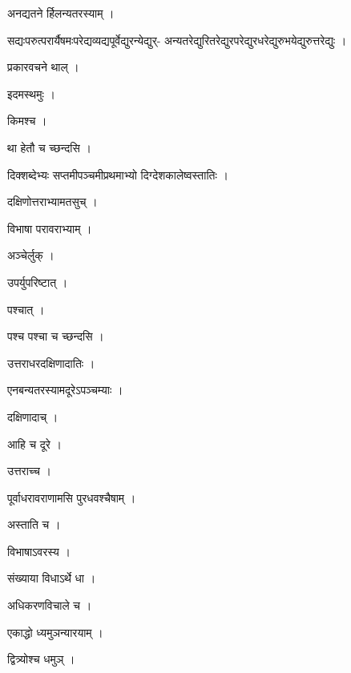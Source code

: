 \documentclass[10pt, openany]{book}
\begin{document}
\noindent अनद्यतने र्हिलन्यतरस्याम् ।

\noindent सद्यःपरुत्परार्यैषमःपरेद्यव्यद्यपूर्वेद्युरन्येद्युर्- अन्यतरेद्युरितरेद्युरपरेद्युरधरेद्युरुभयेद्युरुत्तरेद्युः ।

\noindent प्रकारवचने थाल् ।

\noindent इदमस्थमुः ।

\noindent किमश्च ।

\noindent था हेतौ च च्छन्दसि ।

\noindent दिक्शब्देभ्यः सप्तमीपञ्चमीप्रथमाभ्यो दिग्देशकालेष्वस्तातिः ।

\noindent दक्षिणोत्तराभ्यामतसुच् ।

\noindent विभाषा परावराभ्याम् ।

\noindent अञ्चेर्लुक् ।

\noindent उपर्युपरिष्टात् ।

\noindent पश्चात् ।

\noindent पश्च पश्चा च च्छन्दसि ।

\noindent उत्तराधरदक्षिणादातिः ।

\noindent एनबन्यतरस्यामदूरेऽपञ्चम्याः ।

\noindent दक्षिणादाच् ।

\noindent आहि च दूरे ।

\noindent उत्तराच्च ।

\noindent पूर्वाधरावराणामसि पुरधवश्चैषाम् ।

\noindent अस्ताति च ।

\noindent विभाषाऽवरस्य ।

\noindent संख्याया विधाऽर्थे धा ।

\noindent अधिकरणविचाले च ।

\noindent एकाद्धो ध्यमुञन्यारयाम् ।

\noindent द्वित्र्योश्च धमुञ् ।
\end{document}
